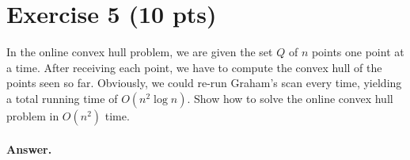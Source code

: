 \documentclass[a4paper]{article}
\begin{document}
\section*{Exercise 5 (10 pts)}

In the online convex hull problem, we are given the set $Q$ of $n$ points one point at a time. After receiving each point, we have to compute the convex hull of the points seen so far. Obviously, we could re-run Graham’s scan every time, yielding a total running time of $O(n^2 \log n)$. Show how to solve the online convex hull problem in $O(n^2)$ time.

\paragraph{Answer.}
\end{document}
